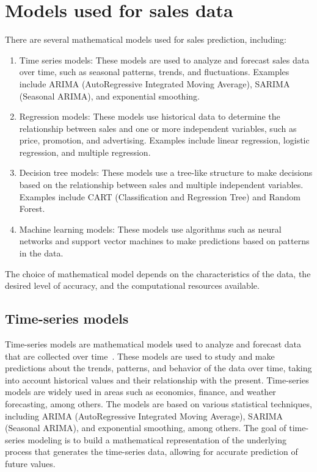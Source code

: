 \section{Models used for sales data} \label{sec:models}
There are several mathematical models used for sales prediction, including:
\\
\begin{enumerate}
    \item Time series models: These models are used to analyze and forecast sales data over time, such as seasonal patterns, trends, and fluctuations. Examples include ARIMA (AutoRegressive Integrated Moving Average), SARIMA (Seasonal ARIMA), and exponential smoothing.
    \item Regression models: These models use historical data to determine the relationship between sales and one or more independent variables, such as price, promotion, and advertising. Examples include linear regression, logistic regression, and multiple regression.
    \item Decision tree models: These models use a tree-like structure to make decisions based on the relationship between sales and multiple independent variables. Examples include CART (Classification and Regression Tree) and Random Forest.
    \item Machine learning models: These models use algorithms such as neural networks and support vector machines to make predictions based on patterns in the data.
\end{enumerate}
The choice of mathematical model depends on the characteristics of the data, the desired level of accuracy, and the computational resources available.
\\
    \subsection{Time-series models} \label{sec:longlp}
    Time-series models are mathematical models used to analyze and forecast data that are collected over time~\cite{Cryer}. These models are used to study and make predictions about the trends, patterns, and behavior of the data over time, taking into account historical values and their relationship with the present. Time-series models are widely used in areas such as economics, finance, and weather forecasting, among others. The models are based on various statistical techniques, including ARIMA (AutoRegressive Integrated Moving Average), SARIMA (Seasonal ARIMA), and exponential smoothing, among others. The goal of time-series modeling is to build a mathematical representation of the underlying process that generates the time-series data, allowing for accurate prediction of future values.
